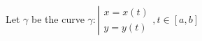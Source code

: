 {\begin{frame}
\begin{columns}[c]
\begin{center}
\end{center}
%
\end{columns}
\end{frame}



\begin{frame}
Let $\gamma $ be the curve
$ \gamma: \left|
\begin{array}{rcl}
x=x(t)\\
y=y(t)
\end{array}, t\in [a,b]
\right.$


\end{frame}}
